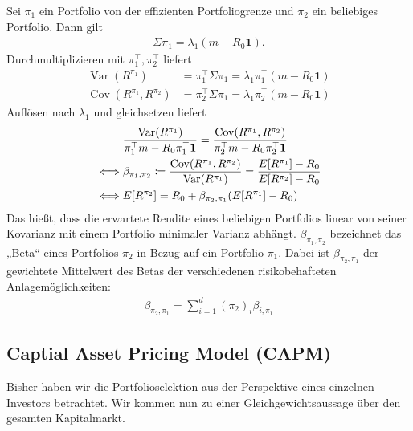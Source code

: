\documentclass[a4paper,twoside,DIV15,BCOR12mm]{scrbook}
\DeclareMathOperator{\Var}{Var}
\DeclareMathOperator{\Cov}{Cov}
\begin{document}
Sei $\pi_1$ ein Portfolio von der effizienten Portfoliogrenze und $\pi_2$ ein beliebiges Portfolio. Dann gilt
\begin{align*}
\Sigma\pi_1 = \lambda_1(m-R_0\mathbf 1).
\end{align*}
Durchmultiplizieren mit $\pi_1^\top, \pi_2^\top$ liefert
\begin{align*}
\Var(R^{\pi_1}) &= \pi_1^\top \Sigma \pi_1 = \lambda_1\pi_1^\top(m-R_0\mathbf 1) \\
\Cov(R^{\pi_1},R^{\pi_2}) &= \pi_2^\top\Sigma \pi_1 = \lambda_1 \pi_2^\top (m-R_0\mathbf 1)
\end{align*}
Auflösen nach $\lambda_1$ und gleichsetzen liefert
\begin{align*}
& \frac{\Var(R^{\pi_1})}{\pi_1^\top m - R_0 \pi_1^\top \mathbf 1} = 
\frac{\Cov(R^{\pi_1},R^{\pi_2})}{\pi_2^\top m - R_0 \pi_2 ^\top \mathbf 1} \\
\iff & \beta_{\pi_1,\pi_2} \da 
\frac{\Cov(R^{\pi_1},R^{\pi_2})}{\Var(R^{\pi_1})} =
\frac{E[R^{\pi_1}]-R_0}{E[R^{\pi_2}]-R_0} \\
\iff & E[R^{\pi_2}] = R_0 + \beta_{\pi_2,\pi_1}(E[R^{\pi_1}]-R_0)
\end{align*}
Das hießt, dass die erwartete Rendite eines beliebigen Portfolios linear von seiner Kovarianz mit einem Portfolio minimaler Varianz abhängt. $\beta_{\pi_1,\pi_2}$ bezeichnet das „Beta“ eines Portfolios $\pi_2$ in Bezug auf ein Portfolio $\pi_1$. Dabei ist $\beta_{\pi_2,\pi_1}$ der gewichtete Mittelwert des Betas der verschiedenen risikobehafteten Anlagemöglichkeiten:
\begin{align*}
\beta_{\pi_2,\pi_1} = \sum_{i=1}^d (\pi_2)_i\beta_{i,\pi_1}
\end{align*}

\subsection{Captial Asset Pricing Model (CAPM)}

Bisher haben wir die Portfolioselektion aus der Perspektive eines einzelnen Investors betrachtet. Wir kommen nun zu einer Gleichgewichtsaussage über den gesamten Kapitalmarkt.
\end{document}
